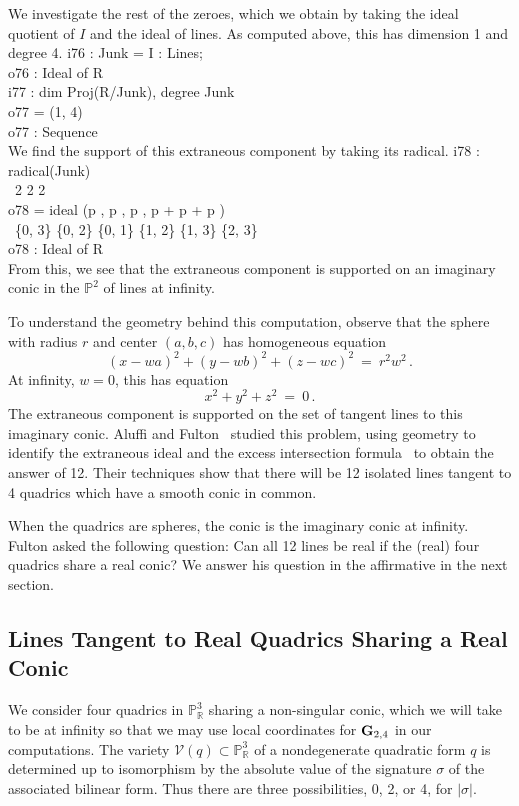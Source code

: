We investigate the rest of the zeroes, which we obtain 
by taking the ideal
quotient of $I$ and the ideal of lines.
As computed above, this has dimension 1 and degree 4.
%
\beginOutput
i76 : Junk = I : Lines;\\
\emptyLine
o76 : Ideal of R\\
\endOutput
%
\beginOutput
i77 : dim Proj(R/Junk), degree Junk\\
\emptyLine
o77 = (1, 4)\\
\emptyLine
o77 : Sequence\\
\endOutput
%
We find the support of this extraneous component by taking its
radical.
%
\beginOutput
i78 : radical(Junk)\\
\emptyLine
\                                         2         2         2\\
o78 = ideal (p      , p      , p      , p       + p       + p      )\\
\              \{0, 3\}   \{0, 2\}   \{0, 1\}   \{1, 2\}    \{1, 3\}    \{2, 3\}\\
\emptyLine
o78 : Ideal of R\\
\endOutput
%
From this, we see that the extraneous component is supported on an imaginary
conic in the ${\mathbb P}^2$ of lines at infinity.
\smallskip

To understand the geometry behind this computation, observe that
the sphere with radius $r$ and center $(a,b,c)$ has homogeneous equation
$$
  (x-wa)^2+(y-wb)^2+(z-wc)^2\ =\ r^2w^2\,.
$$
At infinity, $w=0$, this has equation
$$
  x^2+y^2+z^2\ =\ 0\,.
$$
The extraneous component is supported on the set of tangent
lines to this imaginary conic.
Aluffi and Fulton~\cite{SO:AF} studied
this problem, using geometry to 
identify the extraneous ideal and the excess intersection
formula~\cite{SO:FM76} to obtain the answer of 12. 
Their techniques show that there will be 12 isolated lines tangent to 4
quadrics which have a smooth conic in common.

When the quadrics are spheres, the conic is the imaginary conic at infinity.
Fulton asked the following question:
Can all 12 lines be real if the (real) four quadrics share a real conic?
We answer his question in the affirmative in the next section.


\subsection{Lines Tangent to Real Quadrics Sharing a Real Conic}
We consider four quadrics in ${\mathbb P}^3_{\mathbb R}$ sharing a
non-singular conic, which we will take to be at infinity so that we may use
local coordinates for ${\bf G}_{2,4}$ in our computations.
The variety ${\mathcal V}(q)\subset{\mathbb P}^3_{\mathbb R}$ of a
nondegenerate quadratic form $q$ is determined up to isomorphism by the
absolute value of the signature $\sigma$ of the
associated bilinear form. 
Thus there are three possibilities, 0, 2, or 4, for $|\sigma|$.

